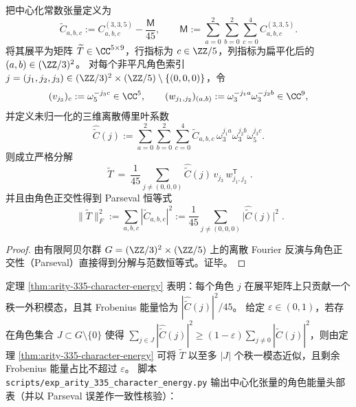 \begin{theorem}[角色分解 \texorpdfstring{$\Rightarrow$}{=>} 低秩机制：\texorpdfstring{$((3,3,5))$}{(3,3,5)} 的秩一外积分解与 Parseval 能量恒等式]\label{thm:arity-335-character-energy}
把中心化常数张量定义为
\[
\widetilde C_{a,b,c}:=C^{(3,3,5)}_{a,b,c}-\frac{\mathsf{M}}{45},
\qquad
\mathsf{M}:=\sum_{a=0}^2\sum_{b=0}^2\sum_{c=0}^4 C^{(3,3,5)}_{a,b,c}.
\]
将其展平为矩阵 \(\widetilde T\in\CC^{5\times 9}\)，行指标为 \(c\in\ZZ/5\)，列指标为扁平化后的 \((a,b)\in(\ZZ/3)^2\)。
对每个非平凡角色索引 \(j=(j_1,j_2,j_3)\in(\ZZ/3)^2\times(\ZZ/5)\setminus\{(0,0,0)\}\)，令
\[
(v_{j_3})_c:=\omega_5^{-j_3 c}\in\CC^{5},
\qquad
(w_{j_1,j_2})_{(a,b)}:=\omega_3^{-j_1 a}\omega_3^{-j_2 b}\in\CC^{9},
\]
并定义未归一化的三维离散傅里叶系数
\[
\widehat{\widetilde C}(j)
:=
\sum_{a=0}^2\sum_{b=0}^2\sum_{c=0}^4
\widetilde C_{a,b,c}\,\omega_3^{j_1 a}\omega_3^{j_2 b}\omega_5^{j_3 c}.
\]
则成立严格分解
\[
\boxed{\;
\widetilde T
\ =\ 
\frac{1}{45}\sum_{j\neq(0,0,0)}
\widehat{\widetilde C}(j)\,v_{j_3}\,w_{j_1,j_2}^{\mathsf T}\; }.
\]
并且由角色正交性得到 Parseval 恒等式
\[
\boxed{\;
\|\widetilde T\|_F^2
:=
\sum_{a,b,c}|\widetilde C_{a,b,c}|^2
:=
\frac{1}{45}\sum_{j\neq(0,0,0)}\bigl|\widehat{\widetilde C}(j)\bigr|^2\; }.
\]
\end{theorem}
\begin{proof}
由有限阿贝尔群 \(G=(\ZZ/3)^2\times(\ZZ/5)\) 上的离散 Fourier 反演与角色正交性（Parseval）直接得到分解与范数恒等式。证毕。
\end{proof}

\begin{remark}[可审计诊断：角色能量头部占比 \texorpdfstring{$\Rightarrow$}{=>} 低秩可压缩]\label{rem:arity-335-character-energy-diagnostic}
定理 \ref{thm:arity-335-character-energy} 表明：每个角色 \(j\) 在展平矩阵上只贡献一个秩一外积模态，且其 Frobenius 能量恰为 \(|\widehat{\widetilde C}(j)|^2/45\)。
给定 \(\varepsilon\in(0,1)\)，若存在角色集合 \(J\subset G\setminus\{0\}\) 使得 \(\sum_{j\in J}|\widehat{\widetilde C}(j)|^2\ge (1-\varepsilon)\sum_{j\ne 0}|\widehat{\widetilde C}(j)|^2\)，则由定理 \ref{thm:arity-335-character-energy} 可将 \(\widetilde T\) 以至多 \(|J|\) 个秩一模态近似，且剩余 Frobenius 能量占比不超过 \(\varepsilon\)。
脚本 \texttt{scripts/exp\_arity\_335\_character\_energy.py} 输出中心化张量的角色能量头部表（并以 Parseval 误差作一致性核验）：

\end{remark}

